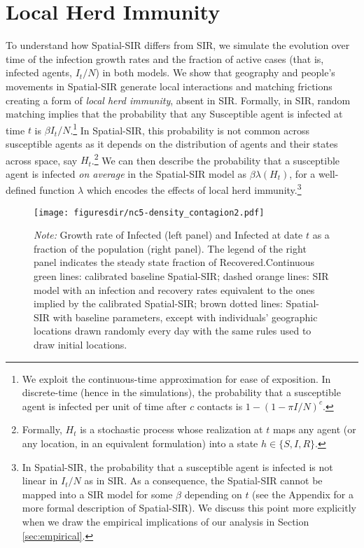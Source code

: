 \documentclass[english,11pt]{article}
\newcommand{\notegrowth}{\emph{Note:} Growth rate of Infected (left panel) and Infected at date $t$ as a fraction of the population (right panel). }
\newcommand{\notelegend}{The legend of the right panel indicates the steady state fraction of Recovered.}
\begin{document}
\section{Local Herd Immunity}\label{sec:SIRcomp}
 
To understand how Spatial-SIR differs from SIR, we simulate the evolution over time of the infection growth rates 
and the fraction
of active cases (that is, infected agents, $I_t/N$) in both models.
We show that geography and people's movements in Spatial-SIR generate local interactions
and matching frictions creating a form of \emph{local herd immunity}, absent in SIR. 
\label{randmatch}Formally, in SIR, random matching implies that  the probability that
any  Susceptible agent is infected at time $t$ is $\beta {I_t}/{N}$.\footnote{
We exploit the continuous-time approximation for ease of exposition. In discrete-time (hence in the simulations), the probability that a susceptible agent is infected per unit of time after $c$ contacts is $1-(1-\pi {I}/{N})^c$.
} 
In Spatial-SIR, this probability is not common across susceptible agents as it depends on the distribution of agents and their states across space, say $H_t$.\footnote{Formally, $H_t$ is a stochastic process whose realization at $t$ maps any agent (or any location, in an equivalent formulation) into a state $h \in \{S, I, R\}.$} We can then describe the probability that a susceptible agent is infected {\em on average} in the Spatial-SIR model as $\beta \lambda(H_t)$, for a well-defined function $\lambda$ which encodes the effects of local herd immunity.\footnote{In Spatial-SIR, the probability that a susceptible agent is infected is not linear in ${I_t}/{N}$ as in SIR. As a consequence, the Spatial-SIR cannot be mapped into a SIR model for some $\beta$ depending on $t$ (see the Appendix for a more formal description of Spatial-SIR). We discuss this point more explicitly when we draw the empirical implications of our analysis in Section \ref{sec:empirical}.}%
 
\begin{figure}
        \caption{SIR and Spatial-SIR comparison of infection dynamics}
        \label{fig:densitycomp}
   	\centering
        \texttt{[image: figuresdir/nc5-density\_contagion2.pdf]}
 
    \caption*{\normalfont\footnotesize 
    \notegrowth
    \notelegend Continuous green lines: calibrated baseline Spatial-SIR; dashed orange lines: SIR model with an infection and recovery rates equivalent to the ones implied by the calibrated Spatial-SIR; brown dotted lines:  Spatial-SIR with baseline parameters, except with individuals' geographic locations drawn randomly every day with the same rules used to draw initial locations.}
\end{figure}
\end{document}
